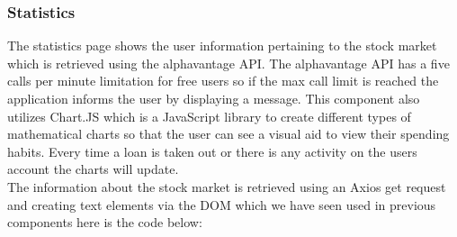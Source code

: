 \subsubsection{Statistics}
The statistics page shows the user information pertaining to the stock market which is retrieved using the
alphavantage API.  The alphavantage API has a five calls per minute limitation for free users so if the
max call limit is reached the application informs the user by displaying a message.  This component also utilizes
Chart.JS which is a JavaScript library to create different types of mathematical charts so that the user can
see a visual aid to view their spending habits.  Every time a loan is taken out or there is any activity on the users
account the charts will update.
\\
The information about the stock market is retrieved using an Axios get request and creating text elements via the DOM which we
have seen used in previous components here is the code below:
